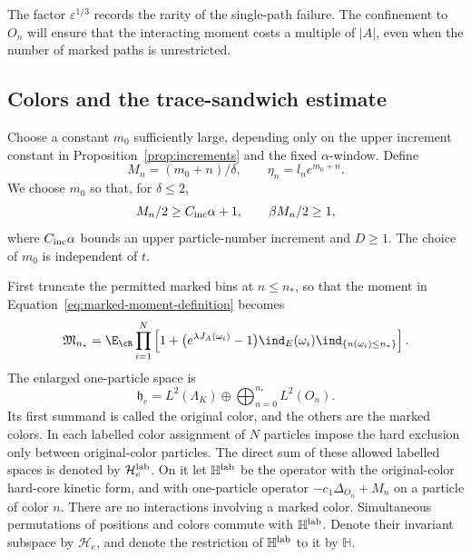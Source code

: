 The factor $\varepsilon^{1/3}$ records the rarity of the
single-path failure.  The confinement to $O_n$ will ensure
that the interacting moment costs a multiple of $|A|$,
even when the number of marked paths is unrestricted.

\subsection{Colors and the trace-sandwich estimate}

Choose a constant $m_0$ sufficiently large, depending only
on the upper increment constant in Proposition~\ref{prop:increments}
and the fixed $\alpha$-window.  Define
\begin{equation}\label{eq:color-gaps}
 M_n=(m_0+n)/\delta,\qquad \eta_n=l_n e^{m_0+n}.
\end{equation}
We choose $m_0$ so that, for $\delta\le2$,
\begin{equation}\label{eq:gap-choice}
 M_n/2\ge C_{\rm inc}\alpha+1,
 \qquad \beta M_n/2\ge1,
\end{equation}
where $C_{\rm inc}\alpha$ bounds an upper particle-number
increment and $D\ge1$.  The choice of $m_0$ is independent
of $t$.

First truncate the permitted marked bins at $n\le n_*$, so that the
moment in Equation~\eqref{eq:marked-moment-definition} becomes
\[
 \mathfrak M_{n_*}
 =\E_{\cR}\prod_{i=1}^N
 \left[1+\bigl(e^{\lambda J_A(\omega_i)}-1\bigr)
       \ind_E(\omega_i)\ind_{\{n(\omega_i)\le n_*\}}\right].
\]
The enlarged one-particle space is
\[
 \mathfrak h_e=L^2(\Lambda_K)
               \oplus\bigoplus_{n=0}^{n_*}L^2(O_n).
\]
Its first summand is called the original color, and the
others are the marked colors.  In each labelled color
assignment of $N$ particles impose the hard exclusion
only between original-color particles.  The direct sum
of these allowed labelled spaces is denoted by
$\mathcal H_e^{\rm lab}$.  On it let $\mathbb H^{\rm lab}$
be the operator with the original-color hard-core kinetic
form, and with one-particle operator
$-c_1\Delta_{O_n}+M_n$ on a particle of color $n$.
There are no interactions involving a marked color.
Simultaneous permutations of positions and colors commute
with $\mathbb H^{\rm lab}$.  Denote their invariant
subspace by $\mathcal H_e$, and denote the restriction
of $\mathbb H^{\rm lab}$ to it by $\mathbb H$.


